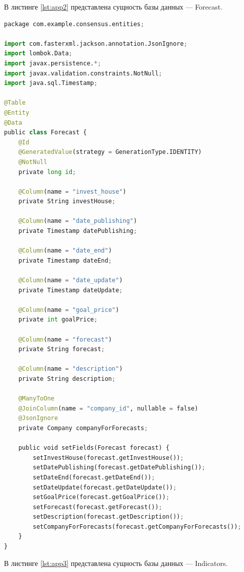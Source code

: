 В листинге \ref{lst:app2} представлена сущность базы данных --- Forecast.


\begin{lstlisting}[label=lst:app2, caption=Сущность Forecast, language=python]
package com.example.consensus.entities;

import com.fasterxml.jackson.annotation.JsonIgnore;
import lombok.Data;
import javax.persistence.*;
import javax.validation.constraints.NotNull;
import java.sql.Timestamp;

@Table
@Entity
@Data
public class Forecast {
	@Id
	@GeneratedValue(strategy = GenerationType.IDENTITY)
	@NotNull
	private long id;

	@Column(name = "invest_house")
	private String investHouse;

	@Column(name = "date_publishing")
	private Timestamp datePublishing;

	@Column(name = "date_end")
	private Timestamp dateEnd;

	@Column(name = "date_update")
	private Timestamp dateUpdate;

	@Column(name = "goal_price")
	private int goalPrice;

	@Column(name = "forecast")
	private String forecast;

	@Column(name = "description")
	private String description;

	@ManyToOne
	@JoinColumn(name = "company_id", nullable = false)
	@JsonIgnore
	private Company companyForForecasts;

	public void setFields(Forecast forecast) {
		setInvestHouse(forecast.getInvestHouse());
		setDatePublishing(forecast.getDatePublishing());
		setDateEnd(forecast.getDateEnd());
		setDateUpdate(forecast.getDateUpdate());
		setGoalPrice(forecast.getGoalPrice());
		setForecast(forecast.getForecast());
		setDescription(forecast.getDescription());
		setCompanyForForecasts(forecast.getCompanyForForecasts());
	}
}
\end{lstlisting}

В листинге \ref{lst:app3} представлена сущность базы данных --- Indicators.

